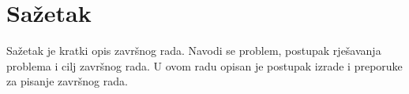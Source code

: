 \section*{Sažetak}
\label{sec:summary}
Sažetak je kratki opis završnog rada. Navodi se problem, postupak rješavanja problema i cilj završnog rada. U ovom radu opisan je postupak izrade i preporuke za pisanje završnog rada. %